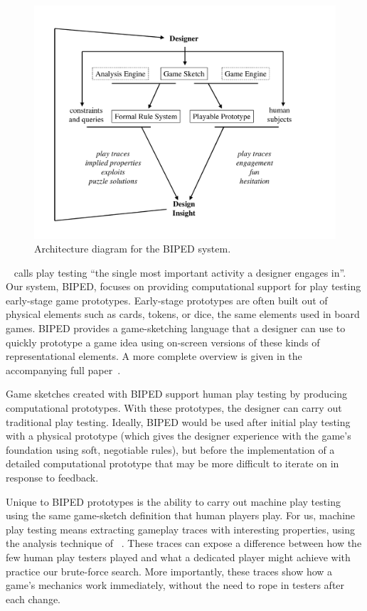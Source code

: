 \documentclass[letterpaper]{article}
\newcommand{\citenoun}[1]{\citeauthor{#1}~\shortcite{#1}}
\newcommand{\citenounpg}[2]{\citeauthor{#2}~\shortcite[#1]{#2}}
\begin{document}
\begin{figure}
\includegraphics[viewport=0.5in 0.5in 9.5in 8in,clip,width=\columnwidth]{architecture.pdf}
\caption{Architecture diagram for the BIPED system.}
\label{fig:arch}
\end{figure}

\citenounpg{p.\ 248}{Fullerton} calls play testing ``the single most important
activity a designer engages in''. Our system, BIPED, focuses on providing
computational support for play testing early-stage game prototypes. Early-stage
prototypes are often built out of physical elements such as cards, tokens, or
dice, the same elements used in board games. BIPED provides a game-sketching
language that a designer can use to quickly prototype a game idea using
on-screen versions of these kinds of representational elements. A more complete
overview is given in the accompanying full paper~\cite{BIPEDfull}.

Game sketches created with BIPED support human play testing by producing 
computational prototypes. With these prototypes, the designer can
carry out traditional play testing.  Ideally, BIPED would be used after initial
play testing with a physical prototype (which gives the designer experience
with the game's foundation using soft, negotiable rules), but before the
implementation of a detailed computational prototype that may be more difficult
to iterate on in response to feedback.

Unique to BIPED prototypes is the ability to carry out machine play testing
using the same game-sketch definition that human players play. For us,
machine play testing means extracting gameplay traces with interesting
properties, using the analysis technique of \citenoun{NelsonMateas:AIIDE08}.
These traces can expose a difference between how the few human play testers
played and what a dedicated player might achieve with practice our brute-force
search. More importantly, these traces show how a game's mechanics work
immediately, without the need to rope in testers after each change.
\end{document}
